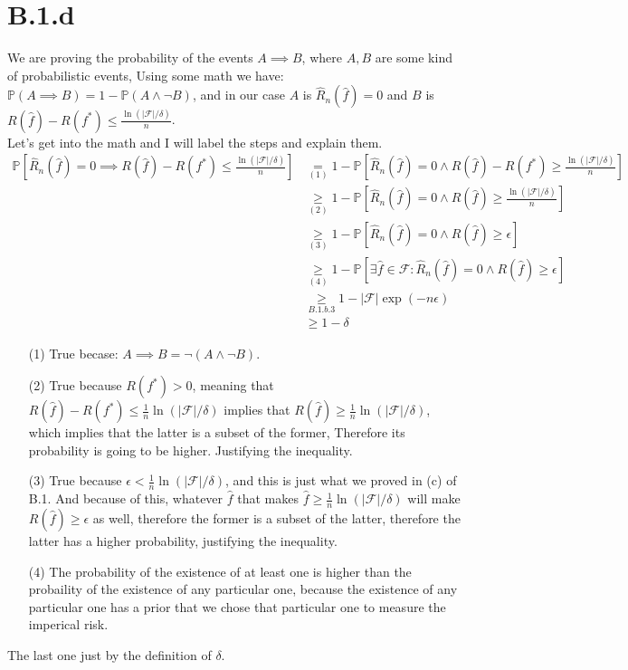 \documentclass[]{article}
\begin{document}
    \section*{B.1.d}
    We are proving the probability of the events $A \implies B$, where $A, B$ are some kind of probabilistic events, Using some math we have: $\mathbb{P}(A\implies B)  = 1 - \mathbb{P}\left(A\wedge \neg B\right)$, and in our case $A$ is $\hat{R}_n(\hat{f}) = 0$ and $B$ is $R(\hat{f}) - R(f^*)\le \frac{\ln(|\mathcal{F}|/\delta)}{n}$. 
    \\
    Let's get into the math and I will label the steps and explain them.
    \begin{align*}\tag{B.1.d.1}\label{eqn:B.1.d.1}
        \mathbb{P}\left[
            \widehat{R}_n(\hat{f}) = 0 \implies R(\hat{f}) - R(f^*) \le \frac{\ln(|\mathcal{F}|/\delta)}{n}
        \right] &\underset{(1)}{=} 
        1 - \mathbb{P}\left[
            \widehat{R}_n(\hat{f}) = 0 \wedge R(\hat{f}) - R(f^*) \ge \frac{\ln(|\mathcal{F}|/\delta)}{n}
        \right]
        \\
        &\underset{(2)}{\ge}
        1 - \mathbb{P}\left[
            \widehat{R}_n(\hat{f}) = 0 \wedge R(\hat{f}) \ge \frac{\ln(|\mathcal{F}|/\delta)}{n}
        \right]
        \\
        &\underset{(3)}{\ge}
        1 - \mathbb{P}\left[
            \widehat{R}_n(\hat{f}) = 0 \wedge R(\hat{f}) \ge \epsilon
        \right]
        \\
        &\underset{(4)}{\ge}
        1 - \mathbb{P}\left[
            \exists \hat{f} \in \mathcal{F}:\widehat{R}_n(\hat{f}) = 0 \wedge R(\hat{f}) \ge \epsilon
        \right]
        \\
        &\underset{\hyperref[eqn:B.1.b.3]{B.1.b.3}}{\ge}
        1 - |\mathcal{F}|\exp(-n\epsilon)
        \\
        &\ge 
        1 - \delta
    \end{align*}
    \begin{enumerate}
        \item[(1)] True becase: $A\implies B = \neg (A \wedge \neg B)$. 
        \item[(2)] True because $R(f^*) > 0$, meaning that $R(\hat{f}) - R(f^*) \le \frac{1}{n}\ln(|\mathcal{F}|/\delta)$ implies that $R(\hat{f}) \ge \frac{1}{n}\ln(|\mathcal{F}|/\delta)$, which implies that the latter is a subset of the former, Therefore its probability is going to be higher. Justifying the inequality. 
        \item[(3)] True because $\epsilon < \frac{1}{n} \ln(|\mathcal{F}|/\delta)$, and this is just what we proved in (c) of B.1. And because of this, whatever $\hat{f}$ that makes $\hat{f} \ge \frac{1}{n}\ln(|\mathcal{F}|/\delta)$ will make $R(\hat{f})\ge \epsilon$ as well, therefore the former is a subset of the latter, therefore the latter has a higher probability, justifying the inequality. 
        \item[(4)] The probability of the existence of at least one is higher than the probaility of the existence of any particular one, because the existence of any particular one has a prior that we chose that particular one to measure the imperical risk. 
    \end{enumerate}    
    The last one just by the definition of $\delta$. 
\end{document}

